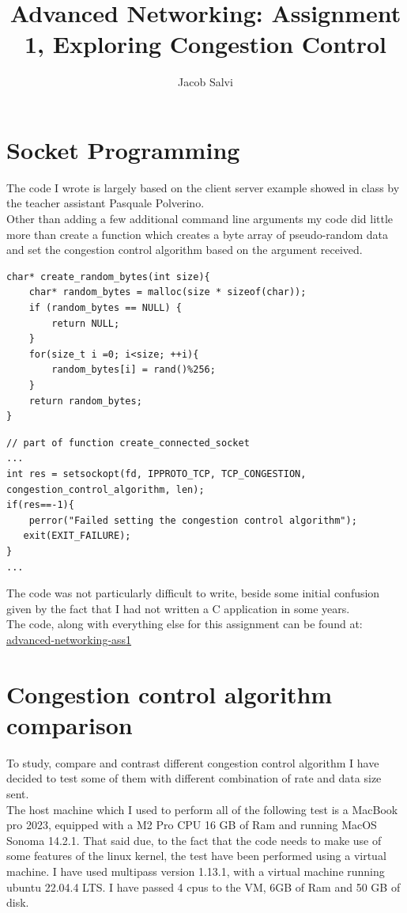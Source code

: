 \documentclass{report}
\title{Advanced Networking: Assignment 1, Exploring Congestion Control}
\author{Jacob Salvi}
\date{}
\begin{document}
\maketitle

\section*{Socket Programming}
The code I wrote is largely based on the client server example showed in class by the teacher assistant Pasquale Polverino.\\ 
Other than adding a few additional command line arguments my code did little more than create a function which creates a byte array of pseudo-random data and set the congestion control algorithm based on the argument received.\\

\begin{verbatim}
char* create_random_bytes(int size){
    char* random_bytes = malloc(size * sizeof(char));
    if (random_bytes == NULL) {
        return NULL;
    }
    for(size_t i =0; i<size; ++i){
        random_bytes[i] = rand()%256;
    }
    return random_bytes;
}
\end{verbatim}

\begin{verbatim}
// part of function create_connected_socket
...
int res = setsockopt(fd, IPPROTO_TCP, TCP_CONGESTION, congestion_control_algorithm, len);
if(res==-1){
    perror("Failed setting the congestion control algorithm");
   exit(EXIT_FAILURE);
}
...
\end{verbatim}
The code was not particularly difficult to write, beside some initial confusion given by the fact that I had not written a C application in some years.\\
The code, along with everything else for this assignment can be found at: \href{https://github.com/JacobSalvi/advanced-networking-ass1}{advanced-networking-ass1}

\section*{Congestion control algorithm comparison}
To study, compare and contrast different congestion control algorithm I have decided to test some of them with different combination of rate and data size sent.\\
The host machine which I used to perform all of the following test is a MacBook pro 2023, equipped with a M2 Pro CPU 16 GB of Ram and running MacOS Sonoma 14.2.1. That said due, to the fact that the code needs to make use of some features of the linux kernel, the test have been performed using a virtual machine. I have used multipass version 1.13.1, with a virtual machine running ubuntu 22.04.4 LTS. I have passed 4 cpus to the VM, 6GB of Ram and 50 GB of disk.\\
\end{document}
